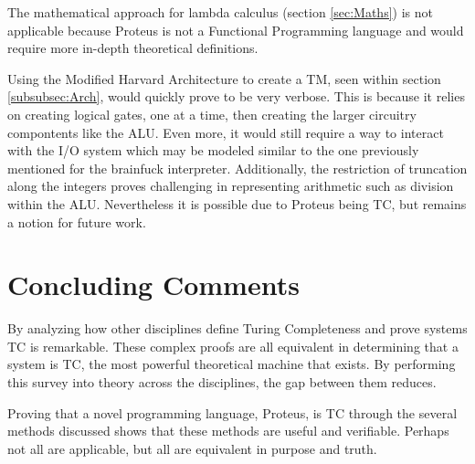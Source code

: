 The mathematical approach for lambda calculus (section \ref{sec:Maths}) is not applicable because Proteus is not a Functional Programming language and would require more in-depth theoretical definitions.

Using the Modified Harvard Architecture to create a TM, seen within section \ref{subsubsec:Arch}, would quickly prove to be very verbose.
This is because it relies on creating logical gates, one at a time, then creating the larger circuitry compontents like the ALU.
Even more, it would still require a way to interact with the I/O system which may be modeled similar to the one previously mentioned for the brainfuck interpreter.
Additionally, the restriction of truncation along the integers proves challenging in representing arithmetic such as division within the ALU.
Nevertheless it is possible due to Proteus being TC, but remains a notion for future work.

\section{Concluding Comments}\label{sec:ConclComm}

By analyzing how other disciplines define Turing Completeness and prove systems TC is remarkable.
These complex proofs are all equivalent in determining that a system is TC, the most powerful theoretical machine that exists.
By performing this survey into theory across the disciplines, the gap between them reduces.

Proving that a novel programming language, Proteus, is TC through the several methods discussed shows that these methods are useful and verifiable.
Perhaps not all are applicable, but all are equivalent in purpose and truth.